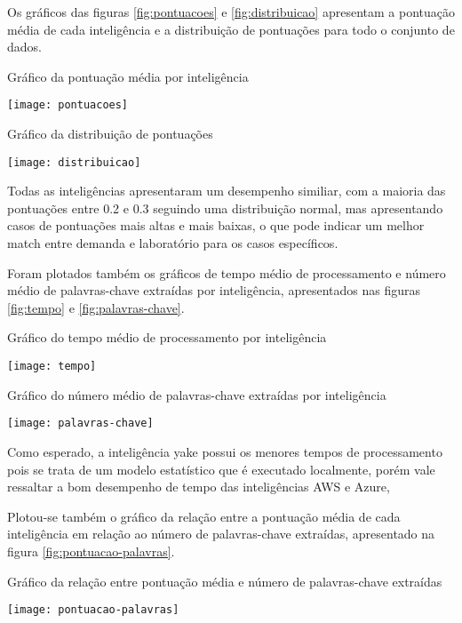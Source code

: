 Os gráficos das figuras \ref{fig:pontuacoes} e \ref{fig:distribuicao} apresentam a pontuação média de cada inteligência e a distribuição de pontuações para todo o conjunto de dados.

\begin{graph}[H]
  \caption{Gráfico da pontuação média por inteligência}
  \texttt{[image: pontuacoes]}
  \label{fig:pontuacoes}
\end{graph}

\begin{graph}[H]
  \caption{Gráfico da distribuição de pontuações}
  \texttt{[image: distribuicao]}
  \label{fig:distribuicao}
\end{graph}

Todas as inteligências apresentaram um desempenho similiar, com a maioria das pontuações entre 0.2 e 0.3 seguindo uma distribuição normal, mas apresentando casos de pontuações mais altas e mais baixas, o que pode indicar um melhor match entre demanda e laboratório para os casos específicos.

Foram plotados também os gráficos de tempo médio de processamento e número médio de palavras-chave extraídas por inteligência, apresentados nas figuras \ref{fig:tempo} e \ref{fig:palavras-chave}.

\begin{graph}[H]
  \caption{Gráfico do tempo médio de processamento por inteligência}
  \texttt{[image: tempo]}
  \label{fig:tempo}
\end{graph}

\begin{graph}[H]
  \caption{Gráfico do número médio de palavras-chave extraídas por inteligência}
  \texttt{[image: palavras-chave]}
  \label{fig:palavras-chave}
\end{graph}

Como esperado, a inteligência \gls{yake} possui os menores tempos de processamento pois se trata de um modelo estatístico que é executado localmente, porém vale ressaltar a bom desempenho de tempo das inteligências AWS e Azure,

Plotou-se também o gráfico da relação entre a pontuação média de cada inteligência em relação
ao número de palavras-chave extraídas, apresentado na figura \ref{fig:pontuacao-palavras}.

\begin{graph}[H]
  \caption{Gráfico da relação entre pontuação média e número de palavras-chave extraídas}
  \texttt{[image: pontuacao-palavras]}
  \label{fig:pontuacao-palavras}
\end{graph}

